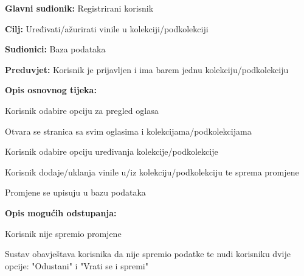 				\noindent {}
					\begin{packed_item}
	
						\item \textbf{Glavni sudionik: }Registrirani korisnik
						\item  \textbf{Cilj:} Uređivati/ažurirati vinile u kolekciji/podkolekciji
						\item  \textbf{Sudionici:} Baza podataka
						\item  \textbf{Preduvjet:} Korisnik je prijavljen i ima barem jednu kolekciju/podkolekciju
						\item  \textbf{Opis osnovnog tijeka:}
						
						\item[] \begin{packed_enum}
	
							\item Korisnik odabire opciju za pregled oglasa
							\item Otvara se stranica sa svim oglasima i kolekcijama/podkolekcijama
							\item Korisnik odabire opciju uređivanja kolekcije/podkolekcije
							\item Korisnik dodaje/uklanja vinile u/iz kolekciju/podkolekciju te sprema promjene
							\item Promjene se upisuju u bazu podataka

						\end{packed_enum}		
						
						\item  \textbf{Opis mogućih odstupanja:}
						
						\item[] \begin{packed_item}
	
							\item[4.a] Korisnik nije spremio promjene
								\begin{packed_item}
									\item Sustav obavještava korisnika da nije spremio podatke te nudi korisniku dvije opcije: "Odustani" i "Vrati se i spremi"
								\end{packed_item}
								
						\end{packed_item}				
					\end{packed_item}
					
